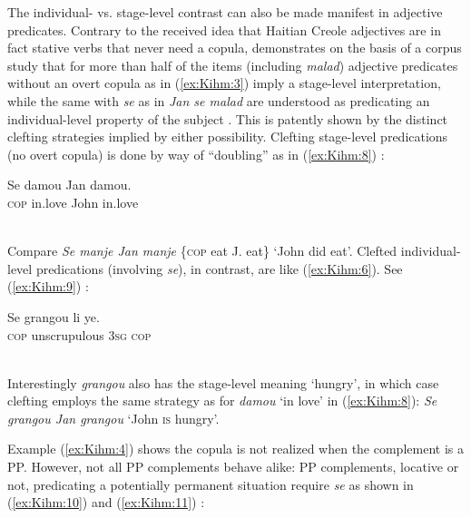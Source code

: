 \documentclass[output=paper]{langsci/langscibook}
\begin{document}
The individual- vs. stage-level contrast can also be made manifest in
adjective predicates. Contrary to the received idea that Haitian Creole
adjectives are in fact stative verbs that never need a copula, %
\citet{Damoiseau1996} %
%
 demonstrates on the basis of a corpus study that for more than
half of the items (including \emph{malad}) adjective predicates without
an overt copula as in (\ref{ex:Kihm:3}) imply a stage-level interpretation, while the
same with \emph{se} as in \emph{Jan se malad} are understood as
predicating an individual-level property of the subject %
\citep[also see][]{Pompilius76}%
%
. This is patently shown by the distinct clefting
strategies implied by either possibility. Clefting stage-level
predications (no overt copula) is done by way of ``doubling'' as in (\ref{ex:Kihm:8})
%
\citep[146]{Deprez2003}%
%
:

\ea\label{ex:Kihm:8} \gll Se damou Jan damou.\\
\textsc{cop} in.love John in.love \\
\glt {} \\
\z

Compare \emph{Se manje Jan manje} \{\textsc{cop} eat J. eat\} `John did
eat'. Clefted individual-level predications (involving \emph{se}), in
contrast, are like (\ref{ex:Kihm:6}). See (\ref{ex:Kihm:9}) %
\citep[157]{Damoiseau1996}%
%
:

\ea\label{ex:Kihm:9} \gll Se grangou li ye.\\
\textsc{cop} unscrupulous \textsc{3sg} \textsc{cop} \\
\glt {} \\
\z

Interestingly \emph{grangou} also has the stage-level meaning `hungry',
in which case clefting employs the same strategy as for \emph{damou} `in
love' in (\ref{ex:Kihm:8}): \emph{Se grangou Jan grangou} `John \textsc{is} hungry'.

Example (\ref{ex:Kihm:4}) shows the copula is not realized when the complement is a
PP. However, not all PP complements behave alike: PP complements,
locative or not, predicating a potentially permanent situation require
\emph{se} as shown in (\ref{ex:Kihm:10}) and (\ref{ex:Kihm:11}) %
\citep[141--142]{Deprez2003}%
%
:
\end{document}
